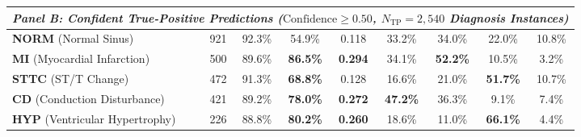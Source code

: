 \documentclass[5p,twocolumn,10pt]{elsarticle}
\begin{document}
\begin{table}[t]
{\begin{tabular}{lcccccccc}
\midrule
\multicolumn{9}{l}{\textit{Panel B: Confident True-Positive Predictions ($\text{Confidence} \ge 0.50$, $N_{\text{TP}} = 2,540$ Diagnosis Instances)}} \\
\midrule
\textbf{NORM} (Normal Sinus) & 921 & 92.3\% & 54.9\% & 0.118 & 33.2\% & 34.0\% & 22.0\% & 10.8\% \\
\textbf{MI} (Myocardial Infarction) & 500 & 89.6\% & \textbf{86.5\%} & \textbf{0.294} & 34.1\% & \textbf{52.2\%} & 10.5\% & 3.2\% \\
\textbf{STTC} (ST/T Change) & 472 & 91.3\% & \textbf{68.8\%} & 0.128 & 16.6\% & 21.0\% & \textbf{51.7\%} & 10.7\% \\
\textbf{CD} (Conduction Disturbance) & 421 & 89.2\% & \textbf{78.0\%} & \textbf{0.272} & \textbf{47.2\%} & 36.3\% & 9.1\% & 7.4\% \\
\textbf{HYP} (Ventricular Hypertrophy) & 226 & 88.8\% & \textbf{80.2\%} & \textbf{0.260} & 18.6\% & 11.0\% & \textbf{66.1\%} & 4.4\% \\
\bottomrule
\end{tabular}%
}
\end{table}
\end{document}
